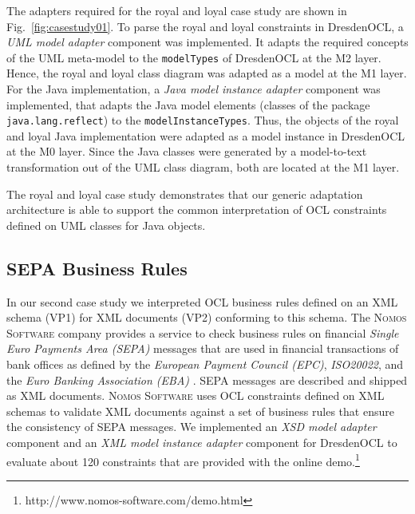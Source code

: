 The adapters required for the royal and loyal case study are shown in Fig.~\ref{fig:casestudy01}. To parse the royal and loyal constraints
in DresdenOCL, a \textit{UML model adapter} component was implemented. It
adapts the required concepts of the UML meta-model to the \texttt{model\-Types}
of DresdenOCL at the M2 layer. Hence, the royal and loyal class diagram was adapted as a model at the M1 layer.
For the Java implementation, a \textit{Java model instance adapter} component was implemented,
that adapts the Java model elements (classes of the package \texttt{java.lang.reflect})
to the \texttt{model\-Instance\-Types}. Thus, the objects of the royal and loyal Java implementation
were adapted as a model instance in DresdenOCL at the M0 layer. 
Since the Java classes were generated by a model-to-text transformation out of the UML class diagram,
both are located at the M1 layer.

The royal and loyal case study demonstrates that our generic adaptation architecture is able to 
support the common interpretation of OCL constraints defined on UML classes for Java objects.


\subsection{SEPA Business Rules}

In our second case study we interpreted OCL business rules
defined on an XML schema (VP1) for XML documents (VP2)
conforming to this schema. The \textsc{Nomos Software} company provides a
service to check business rules on financial \textit{Single Euro Payments Area (SEPA)} messages that are 
used in financial transactions of bank offices as defined by the \textit{European
Payment Council (EPC)}, \textit{ISO20022}, and the \textit{Euro Banking Association (EBA)} \cite{spec:UNIFI,spec:EPC,WWW:EBA}. 
SEPA messages are described and shipped as XML documents.
\textsc{Nomos Software} uses OCL constraints defined on XML schemas
to validate XML documents against a set of business rules that ensure the consistency of
SEPA messages. We implemented an \emph{XSD model adapter} component and an \emph{XML model
instance adapter} component for DresdenOCL to evaluate about 120 constraints that are provided 
with the online demo.\footnote{http://www.nomos-software.com/demo.html}

